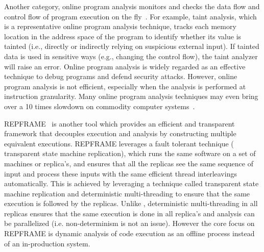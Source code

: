 Another category, online program analysis monitors and checks the data flow and control flow of program execution on the fly~\cite{goodstein2015tracking,ganai2012dtam}.
For example, taint analysis, which is a representative online program analysis technique, tracks each memory location in the address space of the program to identify whether its value is tainted (i.e., directly or indirectly relying on suspicious external input). 
If tainted data is used in sensitive ways (e.g., changing the control flow), the taint analyzer will raise an error. 
Online program analysis is widely regarded as an effective technique to debug programs and defend security attacks. 
However, online program analysis is not efficient, especially when the analysis is performed at instruction granularity. 
Many online program analysis techniques may even bring over a 10 times slowdown on commodity computer systems~\cite{Newsome05dynamictaint}.


REPFRAME~\cite{repframe} is another tool which provides an efficient and transparent framework that decouples execution and analysis by constructing multiple equivalent executions. REPFRAME leverages a fault tolerant technique ( transparent state machine replication), which runs the same software on a set of machines or replica's, and ensures that all the replicas see the same sequence of input and process these inputs with the same efficient thread interleavings automatically. This is achieved by leveraging a technique called transparent state machine replication and deterministic multi-threading to ensure that the same execution is followed by the replicas. Unlike \parikshan, deterministic multi-threading in all replicas ensures that the same execution is done in all replica's and analysis can be parallelized (i.e. non-determinism is not an issue). However the core focus on REPFRAME is dynamic analysis of code execution as an offline process instead of an in-production system.

